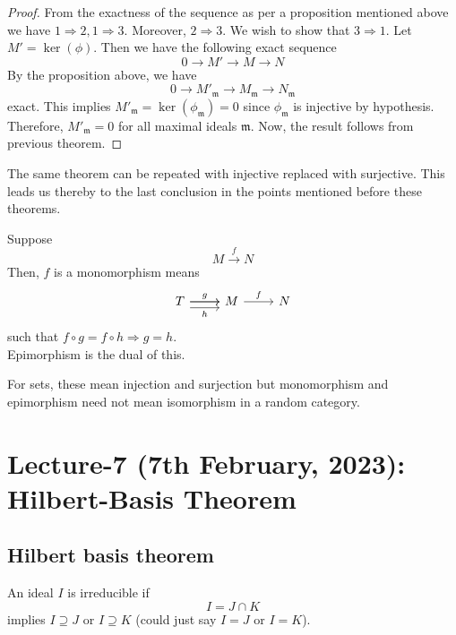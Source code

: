 \documentclass[oneside, 12pt]{scrbook}
\newcommand{\m}{\mathfrak{m}}
\theoremstyle{theorem}
\begin{document}
\begin{proof}
From the exactness of the sequence as per a proposition mentioned above we have $1 \Rightarrow 2, 1 \Rightarrow 3$. Moreover, $2 \Rightarrow 3$. We wish to show that $3 \Rightarrow 1$. Let $M' = \ker (\phi)$. Then we have the following exact sequence $$0 \rightarrow M' \rightarrow M \rightarrow N $$ By the proposition above, we have $$0 \rightarrow M'_{\m} \rightarrow M_{\m} \rightarrow N_{\m} $$ exact. This implies $M'_{\m} = \ker (\phi_{\m}) = 0$ since $\phi_{\m}$ is injective by hypothesis. Therefore, $M'_{\m} = 0$ for all maximal ideals $\m$. Now, the result follows from previous theorem.
\end{proof}

The same theorem can be repeated with injective replaced with surjective. This leads us thereby to the last conclusion in the points mentioned before these theorems.
\begin{definition}
Suppose $$M \xrightarrow{f} N$$ Then, $f$ is a monomorphism means 
\[\begin{tikzcd}
	T & M & N
	\arrow["f", from=1-2, to=1-3]
	\arrow["g", from=1-1, to=1-2]
	\arrow[from=1-1, to=1-2]
	\arrow["h"', shift right=2, from=1-1, to=1-2]
\end{tikzcd}\] such that $f\circ g = f\circ h \Rightarrow g=h$. \\

Epimorphism is the dual of this.
\end{definition}

\begin{remark}
For sets, these mean injection and surjection but monomorphism and epimorphism need not mean isomorphism in a random category. 
\end{remark}

\chapter{Lecture-7 (7th February, 2023): Hilbert-Basis Theorem}

\section{Hilbert basis theorem}

\begin{definition}
An ideal $I$ is irreducible if $$I = J \cap K$$ implies $I \supseteq J$ or $I \supseteq K$ (could just say $I=J$ or $I = K$).
\end{definition}
\end{document}
